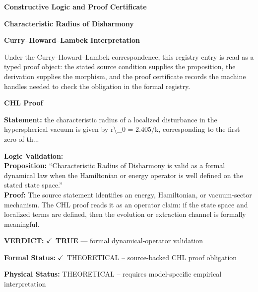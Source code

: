 \clearpage
\begingroup\tzpsupportsetup
\noindent\textbf{\fontsize{10.8pt}{12.8pt}\selectfont [ID 0231] Constructive Logic and Proof Certificate}\par
\noindent\textbf{\fontsize{10pt}{12pt}\selectfont Characteristic Radius of Disharmony}\par
\vspace{0.45em}
\begingroup
\footnotesize
\setlength{\parskip}{0.22em}
\setlength{\parindent}{0pt}
\noindent\textbf{Curry--Howard--Lambek Interpretation}\par
Under the Curry--Howard--Lambek correspondence, this registry entry is read as a typed proof
object: the stated source condition supplies the proposition, the derivation supplies the
morphism, and the proof certificate records the machine handles needed to check the obligation
in the formal registry.

\vspace{0.45em}
\noindent\textbf{CHL Proof}\par
\textbf{Statement:} the characteristic radius of a localized disturbance in the hyperspherical vacuum is
given by r\textbackslash{}\_0 = 2.405/k, corresponding to the first zero of th...

\textbf{Logic Validation:}\\
\textbf{Proposition:} ``Characteristic Radius of Disharmony is valid as a formal dynamical law when the
Hamiltonian or energy operator is well defined on the stated state space.''\\
\textbf{Proof:} The source statement identifies an energy, Hamiltonian, or vacuum-sector mechanism. The
CHL proof reads it as an operator claim: if the state space and localized terms are
defined, then the evolution or extraction channel is formally meaningful.

\textbf{VERDICT:} \ensuremath{\checkmark}\ \textbf{TRUE} --- formal dynamical-operator validation

\textbf{Formal Status:} \ensuremath{\checkmark}\ THEORETICAL -- source-backed CHL proof obligation

\textbf{Physical Status:} THEORETICAL -- requires model-specific empirical interpretation
\par\vspace{0.45em}
\par
\ifTZPDarkEdition
{}
\fi
\endgroup
\endgroup
